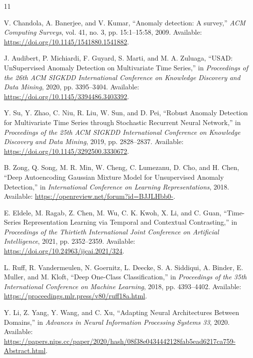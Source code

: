 \documentclass[a4paper]{article}
\begin{document}
\pagebreak

\begin{thebibliography}{11}

V. Chandola, A. Banerjee, and V. Kumar,
``Anomaly detection: A survey,''
\textit{ACM Computing Surveys}, vol. 41, no. 3, pp. 15:1--15:58, 2009.
Available: \url{https://doi.org/10.1145/1541880.1541882}.

J. Audibert, P. Michiardi, F. Guyard, S. Marti, and M. A. Zuluaga,
``USAD: UnSupervised Anomaly Detection on Multivariate Time Series,''
in \textit{Proceedings of the 26th ACM SIGKDD International Conference on Knowledge Discovery and Data Mining}, 2020, pp. 3395--3404.
Available: \url{https://doi.org/10.1145/3394486.3403392}.

Y. Su, Y. Zhao, C. Niu, R. Liu, W. Sun, and D. Pei,
``Robust Anomaly Detection for Multivariate Time Series through Stochastic Recurrent Neural Network,''
in \textit{Proceedings of the 25th ACM SIGKDD International Conference on Knowledge Discovery and Data Mining}, 2019, pp. 2828--2837.
Available: \url{https://doi.org/10.1145/3292500.3330672}.

B. Zong, Q. Song, M. R. Min, W. Cheng, C. Lumezanu, D. Cho, and H. Chen,
``Deep Autoencoding Gaussian Mixture Model for Unsupervised Anomaly Detection,''
in \textit{International Conference on Learning Representations}, 2018.
Available: \url{https://openreview.net/forum?id=BJJLHbb0-}.

E. Eldele, M. Ragab, Z. Chen, M. Wu, C. K. Kwoh, X. Li, and C. Guan,
``Time-Series Representation Learning via Temporal and Contextual Contrasting,''
in \textit{Proceedings of the Thirtieth International Joint Conference on Artificial Intelligence}, 2021, pp. 2352--2359.
Available: \url{https://doi.org/10.24963/ijcai.2021/324}.

L. Ruff, R. Vandermeulen, N. Goernitz, L. Deecke, S. A. Siddiqui, A. Binder, E. Muller, and M. Kloft,
``Deep One-Class Classification,''
in \textit{Proceedings of the 35th International Conference on Machine Learning}, 2018, pp. 4393--4402.
Available: \url{https://proceedings.mlr.press/v80/ruff18a.html}.

Y. Li, Z. Yang, Y. Wang, and C. Xu,
``Adapting Neural Architectures Between Domains,''
in \textit{Advances in Neural Information Processing Systems 33}, 2020.
Available: \url{https://papers.nips.cc/paper/2020/hash/08f38e0434442128fab5ead6217ca759-Abstract.html}.


\end{thebibliography}
\end{document}
